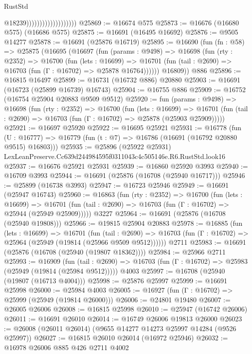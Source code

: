 \begin{lexlean}{RustStd}
\begin{coremodule}
                                          @18239)))))))))))))))))))
@25869 := @16674 @575
@25873 := @16676 (@16680 @575) (@16686 @575)
@25875 := @16691 (@16495 @16692)
@25876 := @9505 @14277
@25878 := @16691 (@25876 @16719)
@25895 := @16690
    (fun (fn : @58) =>
    @25875
      (@16695
        (@16697
          (fun (params : @9498) =>
          @16698
            (fun (rty : @2352) =>
            @16700
              (fun (lets : @16699) =>
              @16701 (fun (tail : @2690) => @16703 (fun (Γ : @16702) => @25878 @16764))))))
        @16809))
    @886
@25896 := @16815 @16497
@25899 := @16731 (@16732 @886) @20880
@25903 := @16691 (@16723 (@25899 @16739) @16743)
@25904 := @16755 @886
@25909 := @16752 (@16754 @25904 @20883 @9509 @9512)
@25920 := fun (params : @9498) =>
  @16698
    (fun (rty : @2352) =>
    @16700
      (fun (lets : @16699) =>
      @16701 (fun (tail : @2690) => @16703 (fun (Γ : @16702) => @25878 (@25903 @25909)))))
@25921 := @16697 @25920
@25922 := @16695 @25921
@25931 := @16778
    (fun (U : @16777) => @16779 (fun (t : @7) => @16786 (@16691 (@16792 @20880 @9515) @16803)))
@25935 := @25896 (@25922 @25931) LexLeanPreserve.Cc639d244984595f0311043c4c505146e.R6.RustStd.look16
@25937 := @16676 @25921 @25931
@25939 := @16860 @25920 @3993
@25940 := @16709 @3993
@25944 := @16691 (@25876 (@16708 (@25940 @16717)))
@25946 := @25899 (@16738 @3993)
@25947 := @16723 @25946
@25949 := @16691 (@25947 @16743)
@25960 := @16863
    (fun (rty : @2352) =>
    @16700
      (fun (lets : @16699) =>
      @16701 (fun (tail : @2690) => @16703 (fun (Γ : @16702) => @25944 (@25949 @25909)))))
    @3227
@25964 := @16691 (@25876 (@16708 (@25940 @19808)))
@25966 := @19815 @25904 @20883
@25978 := @16885
    (fun (lets : @16699) =>
    @16701
      (fun (tail : @2690) =>
      @16703 (fun (Γ : @16702) => @25964 (@25949 (@19814 (@25966 @9509 @9512))))))
    @2711
@25983 := @16691 (@25876 (@16708 (@25940 (@19807 @18362))))
@25984 := @25966 @2711
@25993 := @16909
    (fun (tail : @2690) => @16703 (fun (Γ : @16702) => @25983 (@25949 (@19814 (@25984 @9512)))))
    @4003
@25997 := @16708 (@25940 (@19807 (@16713 @4004)))
@25998 := @25876 @25997
@25999 := @16691 @25998
@26000 := @25984 @4003
@26005 := @16927 (fun (Γ : @16702) => @25999 (@25949 (@19814 @26000)))
@26006 := @24801 @19480
@26007 := @26005 @26006
@26008 := @16815 @25998
@26010 := @25947 (@16742 @26006)
@26011 := @16691 @26010
@26014 := @16749 @26006 @19813 @26000
@26023 := @26008 (@26011 @26014) (@9655 @14277 @14273 @25997 @14284 (@9526 @25997))
@26027 := @16815 @26010 @26014 (@16972 @25946)
@26032 := @16978 @26006 @885 @426 @2711 @4002

\end{coremodule}
\end{lexlean}
